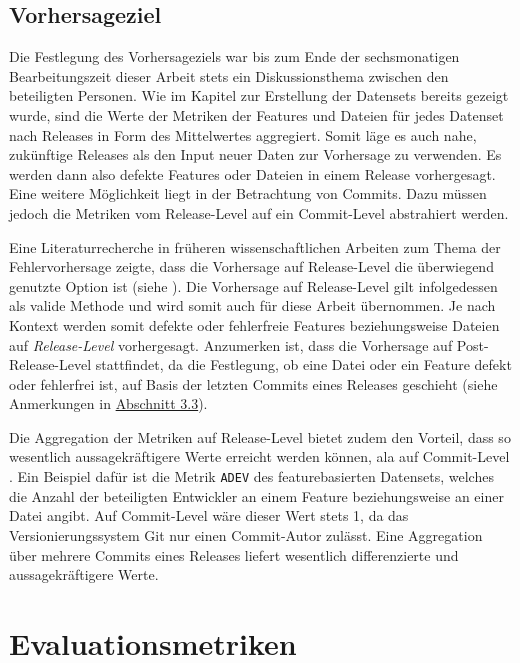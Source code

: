\subsection*{Vorhersageziel}
Die Festlegung des Vorhersageziels war bis zum Ende der sechsmonatigen Bearbeitungszeit dieser Arbeit stets ein Diskussionsthema zwischen den beteiligten Personen. Wie im Kapitel zur Erstellung der Datensets bereits gezeigt wurde, sind die Werte der Metriken der Features und Dateien für jedes Datenset nach Releases in Form des Mittelwertes aggregiert. Somit läge es auch nahe, zukünftige Releases als den Input neuer Daten zur Vorhersage zu verwenden. Es werden dann also defekte Features oder Dateien in einem Release vorhergesagt. Eine weitere Möglichkeit liegt in der Betrachtung von Commits. Dazu müssen jedoch die Metriken vom Release-Level auf ein Commit-Level abstrahiert werden.

Eine Literaturrecherche in früheren wissenschaftlichen Arbeiten zum Thema der Fehlervorhersage zeigte, dass die Vorhersage auf Release-Level die überwiegend genutzte Option ist (siehe \cite{Queiroz2016,Zimmermann2007,Moser2008,Dhiauddin2012,Wang2012,Li2017}). Die Vorhersage auf Release-Level gilt infolgedessen als valide Methode und wird somit auch für diese Arbeit übernommen. Je nach Kontext werden somit defekte oder fehlerfreie Features beziehungsweise Dateien auf \emph{Release-Level} vorhergesagt. Anzumerken ist, dass die Vorhersage auf Post-Release-Level stattfindet, da die Festlegung, ob eine Datei oder ein Feature defekt oder fehlerfrei ist, auf Basis der letzten Commits eines Releases geschieht (siehe Anmerkungen in \hyperref[label-explanation]{Abschnitt 3.3}).

Die Aggregation der Metriken auf Release-Level bietet zudem den Vorteil, dass so wesentlich aussagekräftigere Werte erreicht werden können, ala auf Commit-Level \cite{Zimmermann2007}. Ein Beispiel dafür ist die Metrik \texttt{ADEV} des featurebasierten Datensets, welches die Anzahl der beteiligten Entwickler an einem Feature beziehungsweise an einer Datei angibt. Auf Commit-Level wäre dieser Wert stets 1, da das Versionierungssystem Git nur einen Commit-Autor zulässt. Eine Aggregation über mehrere Commits eines Releases liefert wesentlich differenzierte und aussagekräftigere Werte.

\section{Evaluationsmetriken}
\label{eval-metrics}

